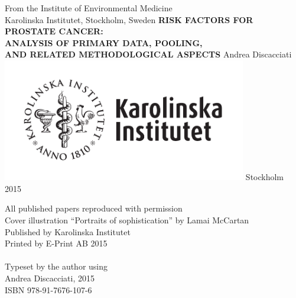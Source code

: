 %

\begin{titlepage}
\begin{center}
\large
From the Institute of Environmental Medicine \\
Karolinska Institutet, Stockholm, Sweden        
\vfill
\Large
\textbf{\textsf{RISK FACTORS FOR PROSTATE CANCER:\\ ANALYSIS OF PRIMARY DATA, POOLING, \\AND RELATED METHODOLOGICAL ASPECTS}}
\vfill
\Large
Andrea Discacciati
\vfill
\includegraphics[width=0.8\textwidth]{figures/ki-logo_pos}
\vfill
\large
Stockholm 2015        
\end{center}
\restoregeometry
\end{titlepage}

\newpage
\null
\vfill
\noindent All published papers reproduced with permission \\
Cover illustration ``Portraits of sophistication'' by Lamai McCartan \\
Published by Karolinska Institutet \\
Printed by E-Print AB 2015 \\
\\
Typeset by the author using \LaTeXe \\
\textcopyright Andrea Discacciati, 2015 \\
ISBN 978-91-7676-107-6
